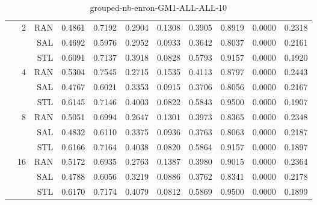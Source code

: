 \begin{center}
\begin{table}[htbp]
\begin{center}
\begin{tabular}{ | r | r | r | r | r | r | r | r | r | r | r |}
 & \multirow{3}{*}{2} & RAN & 0.4861 & 0.7192 & 0.2904 & 0.1308 & 0.3905 & 0.8919 & 0.0000 & 0.2318\\ \cline{3-11}
 &   & SAL & 0.4692 & 0.5976 & 0.2952 & 0.0933 & 0.3642 & 0.8037 & 0.0000 & 0.2161\\ \cline{3-11}
 &   & STL & 0.6091 & 0.7137 & 0.3918 & 0.0828 & 0.5793 & 0.9157 & 0.0000 & 0.1920\\ \cline{2-11}
 & \multirow{3}{*}{4} & RAN & 0.5304 & 0.7545 & 0.2715 & 0.1535 & 0.4113 & 0.8797 & 0.0000 & 0.2443\\ \cline{3-11}
 &   & SAL & 0.4767 & 0.6021 & 0.3353 & 0.0915 & 0.3706 & 0.8056 & 0.0000 & 0.2167\\ \cline{3-11}
 &   & STL & 0.6145 & 0.7146 & 0.4003 & 0.0822 & 0.5843 & 0.9500 & 0.0000 & 0.1907\\ \cline{2-11}
 & \multirow{3}{*}{8} & RAN & 0.5051 & 0.6994 & 0.2647 & 0.1301 & 0.3973 & 0.8365 & 0.0000 & 0.2348\\ \cline{3-11}
 &   & SAL & 0.4832 & 0.6110 & 0.3375 & 0.0936 & 0.3763 & 0.8063 & 0.0000 & 0.2187\\ \cline{3-11}
 &   & STL & 0.6166 & 0.7164 & 0.4038 & 0.0820 & 0.5864 & 0.9157 & 0.0000 & 0.1897\\ \cline{2-11}
 & \multirow{3}{*}{16} & RAN & 0.5172 & 0.6935 & 0.2763 & 0.1387 & 0.3980 & 0.9015 & 0.0000 & 0.2364\\ \cline{3-11}
 &   & SAL & 0.4788 & 0.6056 & 0.3219 & 0.0886 & 0.3762 & 0.8341 & 0.0000 & 0.2178\\ \cline{3-11}
 &   & STL & 0.6170 & 0.7174 & 0.4079 & 0.0812 & 0.5869 & 0.9500 & 0.0000 & 0.1899\\ \cline{2-11}
\hline
\end{tabular}
\caption{grouped-nb-enron-GM1-ALL-ALL-10}
\end{center}
 \end{table}
\end{center}

